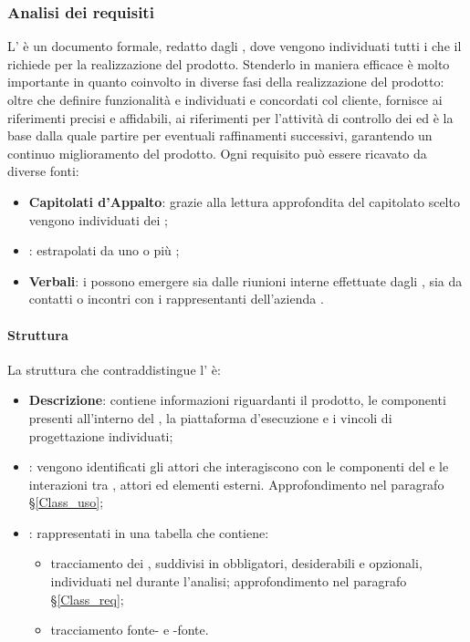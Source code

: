 \subsubsection{Analisi dei requisiti}
L' \AdR{} è un documento formale, redatto dagli \anas{}, dove vengono individuati tutti i  che il  richiede per la realizzazione del prodotto. Stenderlo in maniera efficace è molto importante in quanto coinvolto in diverse fasi della realizzazione del prodotto: oltre che definire funzionalità e  individuati e concordati col cliente, fornisce ai \progs{} riferimenti precisi e affidabili, ai \vers{} riferimenti per l'attività di controllo dei  ed è la base dalla quale partire per eventuali raffinamenti successivi, garantendo un continuo miglioramento del prodotto. 
Ogni requisito può essere ricavato da diverse fonti: 
\begin{itemize}
	\item \textbf{Capitolati d'Appalto}: grazie alla lettura approfondita del capitolato scelto vengono individuati dei ;
	\item \textbf{}:  estrapolati da uno o più ; 
	\item \textbf{Verbali}: i  possono emergere sia dalle riunioni interne effettuate dagli \anas{}, sia da contatti o incontri con i rappresentanti dell'azienda .
\end{itemize}
\paragraph*{Struttura} 
La struttura che contraddistingue l'\AdR{} è:
\begin{itemize}
	\item \textbf{Descrizione}: contiene informazioni riguardanti il prodotto, le componenti presenti all'interno del , la piattaforma d'esecuzione e i vincoli di progettazione individuati;
	\item \textbf{}: vengono identificati gli attori che interagiscono con le componenti del  e le interazioni tra , attori ed elementi esterni. Approfondimento nel paragrafo \S{}\ref{Class_uso};
	\item \textbf{}: rappresentati in una tabella che contiene:
	\begin{itemize}
 		\item tracciamento dei , suddivisi in obbligatori, desiderabili e opzionali, individuati nel  durante l'analisi; approfondimento nel paragrafo \S{}\ref{Class_req};
		\item tracciamento fonte- e -fonte. 
	\end{itemize}
\end{itemize} 
